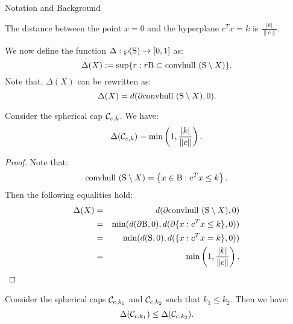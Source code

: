\begin{subsection}{Notation and Background}
\begin{remark}\label{prop:distance}The distance between the point $x=0$ and the hyperplane $c^Tx = k$ is $\frac{|k|}{\|c\|}$.
\end{remark}

We now define the function $\Delta: \wp(\text{S}) \to [0,1]$ as:
\begin{equation}\label{shrinkage}
\Delta(X) := \sup \{r: r\text{B} \subset \mbox{convhull }(\text{S} \setminus X)\}.\end{equation}
Note that, $\Delta(X)$ can be rewritten as:
\begin{equation}\label{shrinkage2}
\Delta(X) =  d(\partial  \mbox{convhull }(\text{S} \setminus X), 0).
\end{equation}


\begin{lemma} \label{lemma:delta2} Consider the spherical cap $\mathcal{C}_{c,k}$. We have:
$$\Delta(\mathcal{C}_{c,k}) = \min\left(1, \frac{|k|}{\|c\|}\right).$$
\end{lemma}

\begin{proof}
Note that: $$\mbox{convhull }(\text{S} \setminus X)= \left\{x \in \text{B} : c^Tx \leq k \right\}.$$
Then the following equalities hold:
\begin{eqnarray}
\nonumber \Delta(X) &=& d(\partial \mbox{convhull }(\text{S} \setminus X), 0) \\
\nonumber &=& \min(d(\partial \text{B}, 0), d(\partial\{x : c^Tx \leq k\}, 0)) \\
\nonumber &=& \min(d(\text{S}, 0), d(\{x : c^Tx = k\}, 0)) \\
\nonumber &=& \min\left(1, \frac{|k|}{\|c\|}\right).
\end{eqnarray}
\end{proof}

\begin{corollary}\label{lemma:deltaMonotone} Consider the spherical caps $\mathcal{C}_{c, k_1}$ and $\mathcal{C}_{c, k_2}$ such that $k_1 \leq k_2$. Then we have: $$\Delta(\mathcal{C}_{c,k_1}) \leq \Delta(\mathcal{C}_{c,k_2}).$$
\end{corollary}
\end{subsection}

